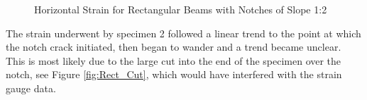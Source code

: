 \documentclass[11pt,a4paper]{article}
\numberwithin{equation}{subsection}
\begin{document}
\begin{figure}[h]
	\begin{center}
	\end{center}
	\caption{Horizontal Strain for Rectangular Beams with Notches of Slope 1:2}
	\label{fig:Rect_12_Z}
\end{figure}
\pagebreak

\noindent
The strain underwent by specimen 2 followed a linear trend to the point at which the notch crack initiated, then began to wander and a trend became unclear. This is most likely due to the large cut into the end of the specimen over the notch, see Figure \ref{fig:Rect_Cut}, which would have interfered with the strain gauge data. 

\vspace*{\baselineskip}
\end{document}
